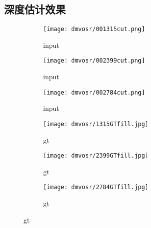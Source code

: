 \subsection{深度估计效果}
\label{sec:deepsr_exp_depth}
\begin{figure}[h]
    \centering
    \begin{subfigure}[c]{0.32\textwidth}
        \texttt{[image: dmvosr/001315cut.png]}
        \caption{input}
    \end{subfigure}
    \vspace*{2mm}
    \begin{subfigure}[c]{0.32\textwidth}
        \texttt{[image: dmvosr/002399cut.png]}
        \caption{input}
    \end{subfigure}
    \vspace*{2mm}
    \begin{subfigure}[c]{0.32\textwidth}
        \texttt{[image: dmvosr/002784cut.png]}
        \caption{input}
    \end{subfigure}
    \vspace*{2mm}
    \begin{subfigure}[c]{0.32\textwidth}
        \texttt{[image: dmvosr/1315GTfill.jpg]}
        \caption{gt}
    \end{subfigure}
    \vspace*{2mm}
    \begin{subfigure}[c]{0.32\textwidth}
        \texttt{[image: dmvosr/2399GTfill.jpg]}
        \caption{gt}
    \end{subfigure}
    \vspace*{2mm}
    \begin{subfigure}[c]{0.32\textwidth}
        \texttt{[image: dmvosr/2784GTfill.jpg]}
        \caption{gt}
    \end{subfigure}


\end{figure}
